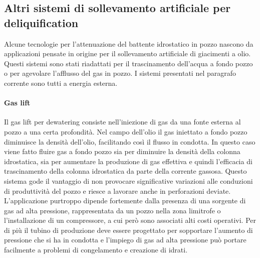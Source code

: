 \subsection[Altri sistemi per GWD]{Altri sistemi di sollevamento artificiale per deliquification}
Alcune tecnologie per l'attenuazione del battente idrostatico in pozzo nascono da applicazioni pensate in origine per il sollevamento artificiale di giacimenti a olio. Questi sistemi sono stati riadattati per il trascinamento dell'acqua a fondo pozzo o per agevolare l'afflusso del gas in pozzo. I sistemi presentati nel paragrafo corrente sono tutti a energia esterna.
\paragraph{Gas lift}
Il gas lift per dewatering consiste nell'iniezione di gas da una fonte esterna al pozzo a una certa profondità. Nel campo dell'olio il gas iniettato a fondo pozzo diminuisce la densità dell'olio, facilitando così il flusso in condotta. In questo caso viene fatto fluire gas a fondo pozzo sia per diminuire la densità della colonna idrostatica, sia per aumentare la produzione di gas effettiva e quindi l'efficacia di trascinamento della colonna idrostatica da parte della corrente gassosa. Questo sistema gode il vantaggio di non provocare significative variazioni alle conduzioni di produttività  del pozzo e riesce a lavorare anche in perforazioni deviate. L'applicazione purtroppo dipende fortemente dalla presenza di una sorgente di gas ad alta pressione, rappresentata da un pozzo nella zona limitrofe o l'installazione di un compressore, a cui però sono associati alti costi operativi. Per di più il tubino di produzione deve essere progettato per sopportare l'aumento di pressione che si ha in condotta e l'impiego di gas ad alta pressione può portare facilmente a problemi di congelamento e creazione di idrati.
